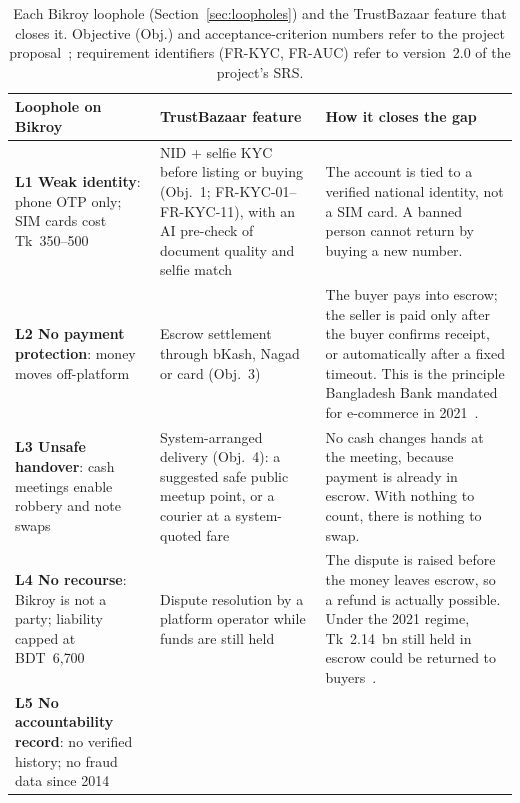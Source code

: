 \begin{table}[!tbp]
  \centering
  \small
  \caption{Each Bikroy loophole (Section~\ref{sec:loopholes}) and the TrustBazaar feature that
  closes it. Objective (Obj.) and acceptance-criterion numbers refer to the project
  proposal~\cite{proposal}; requirement identifiers (FR-KYC, FR-AUC) refer to version~2.0 of the
  project's SRS.}
  \label{tab:mapping}
  \begin{tabularx}{\textwidth}{@{}>{\raggedright\arraybackslash}p{2.9cm}
                                  >{\raggedright\arraybackslash}p{3.3cm} Y@{}}
    \toprule
    \textbf{Loophole on Bikroy} & \textbf{TrustBazaar feature} & \textbf{How it closes the gap} \\
    \midrule
    \textbf{L1 Weak identity}: phone OTP only; SIM cards cost Tk~350--500~\cite{fs_fraud,ds_muktagacha}
      & NID + selfie KYC before listing or buying (Obj.~1; FR-KYC-01--FR-KYC-11), with an AI pre-check of
        document quality and selfie match
      & The account is tied to a verified national identity, not a SIM card. A banned person
        cannot return by buying a new number. \\
    \addlinespace
    \textbf{L2 No payment protection}: money moves off-platform~\cite{bikroy_terms,bikroy_safety}
      & Escrow settlement through bKash, Nagad or card (Obj.~3)
      & The buyer pays into escrow; the seller is paid only after the buyer confirms receipt, or
        automatically after a fixed timeout. This is the principle Bangladesh Bank mandated for
        e-commerce in 2021~\cite{tbs_escrow}. \\
    \addlinespace
    \textbf{L3 Unsafe handover}: cash meetings enable robbery and note swaps~\cite{dt_2014,pa_2023}
      & System-arranged delivery (Obj.~4): a suggested safe public meetup point, or a courier
        at a system-quoted fare
      & No cash changes hands at the meeting, because payment is already in escrow. With nothing
        to count, there is nothing to swap. \\
    \addlinespace
    \textbf{L4 No recourse}: Bikroy is not a party; liability capped at
      BDT~6{,}700~\cite{bikroy_terms}
      & Dispute resolution by a platform operator while funds are still held
      & The dispute is raised before the money leaves escrow, so a refund is actually possible.
        Under the 2021 regime, Tk~2.14~bn still held in escrow could be returned to
        buyers~\cite{fe_refund}. \\
    \addlinespace
    \textbf{L5 No accountability record}: no verified history; no fraud data since 2014~\cite{dt_2014}

\end{tabularx}
\end{table}
